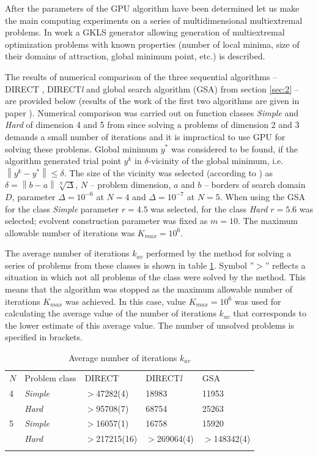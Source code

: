 \documentclass[smallcondensed]{svjour3}     %
\begin{document}
After the parameters of the GPU algorithm have been determined let us make the main computing experiments on a series of multidimensional multiextremal problems. In work \cite{RefGaviano} a GKLS generator allowing generation of multiextremal optimization problems with known properties (number of local minima, size of their domains of attraction, global minimum point, etc.) is described.  

The results of numerical comparison of the three sequential algorithms -- DIRECT \cite{RefJones}, DIRECT\textit{l} \cite{RefGablonsky} and global search algorithm (GSA) from section \ref{sec:2} -- are provided below (results of the work of the first two algorithms are given in paper \cite{RefGaviano}). Numerical comparison was carried out on function classes \textit{Simple} and \textit{Hard} of dimension 4 and 5 from \cite{RefGaviano} since solving a problems of dimension 2 and 3 demands a small number of iterations and it is impractical to use GPU for solving these problems. Global minimum $y^\ast$ was considered to be found, if the algorithm generated trial point $y^k$ in $\delta$-vicinity of the global minimum, i.e. $\left\|y^k-y^\ast\right\|\leq\delta$. The size of the vicinity was selected (according to \cite{RefGaviano}) as $\delta = \left\|b-a\right\|\sqrt[N]{\Delta}$, $N$ -- problem dimension, $a$ and $b$ -- borders of search domain $D$, parameter $\Delta=10^{-6}$ at $N=4$ and $\Delta=10^{-7}$ at $N=5$. When using the GSA for the class \textit{Simple} parameter $r=4.5$ was selected, for the class \textit{Hard} $r=5.6$ was selected; evolvent construction parameter was fixed as $m=10$. The maximum allowable number of iterations was $K_{max} = 10^6$.

The average number of iterations $k_{av}$ performed by the method for solving a series of problems from these classes is shown in table \ref{tab:3}. Symbol ''$>$''  reflects a situation in which not all problems of the class were solved by the method. This means that the algorithm was stopped as the maximum allowable number of iterations $K_{max}$ was achieved. In this case, value $K_{max}=10^6$ was used for calculating the average value of the number of iterations $k_{av}$ that corresponds to the lower estimate of this average value. The number of unsolved problems is specified in brackets.

\begin{table}
	\caption{Average number of iterations $k_{av}$}
	\label{tab:3}
	\center
	\begin{tabular}{lllll}
		\hline\noalign{\smallskip}
  	 $N$ & Problem class & DIRECT & DIRECT\textit{l} & GSA \\
		\noalign{\smallskip} \hline \noalign{\smallskip}
			4 &	\textit{Simple}	& $>$47282(4) &	18983 &	11953 \\
	      & \textit{Hard} &	$>$95708(7) &	68754 &	25263 \\
			5	& \textit{Simple} &	$>$16057(1) &	16758 &	15920 \\
				& \textit{Hard} &	$>$217215(16) &	$>$269064(4) & $>$148342(4) \\
		\noalign{\smallskip}\hline
	\end{tabular}
\end{table}
\end{document}
